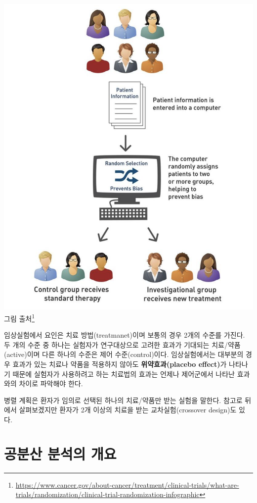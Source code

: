 \documentclass[
]{book}
\renewcommand{\href}[2]{#2\footnote{\url{#1}}}
\begin{document}
\includegraphics{parallel.png}
\href{https://www.cancer.gov/about-cancer/treatment/clinical-trials/what-are-trials/randomization/clinical-trial-randomization-infographic}{그림 출처}

임상실험에서 요인은 치료 방법(treatmanet)이며 보통의 경우 2개의 수준를 가진다. 두 개의 수준 중 하나는 실험자가 연구대상으로 고려한 효과가 기대되는 치료/약품(active)이며 다른 하나의 수준은 제어 수준(control)이다. 임상실험에서는 대부분의 경우 효과가 있는 치료나 약품을 적용하지 않아도 \textbf{위약효과(placebo effect)}가 나타나기 때문에 실험자가 사용하려고 하는 치료법의 효과는 언제나 제어군에서 나타난 효과와의 차이로 파악해야 한다.

병렬 계획은 환자가 임의로 선택된 하나의 치료/약품만 받는 실험을 말한다. 참고로 뒤에서 살펴보겠지만 환자가 2개 이상의 치료을 받는 교차실험(crossover design)도 있다.

\hypertarget{uxacf5uxbd84uxc0b0-uxbd84uxc11duxc758-uxac1cuxc694}{%
\section{공분산 분석의 개요}\label{uxacf5uxbd84uxc0b0-uxbd84uxc11duxc758-uxac1cuxc694}}
\end{document}
